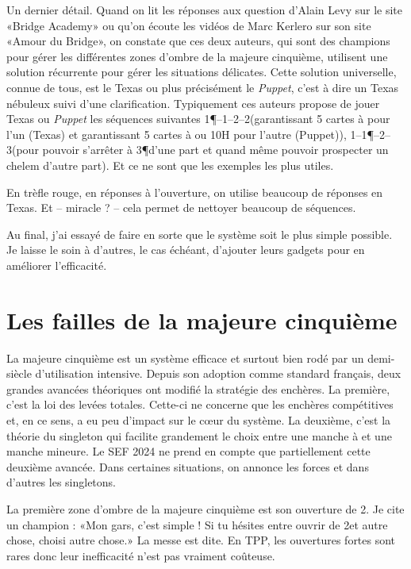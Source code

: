 Un dernier détail. Quand on lit les réponses aux question d'Alain Levy sur le site «Bridge Academy» ou qu'on écoute les vidéos de Marc Kerlero sur son site «Amour du Bridge», on constate que ces deux auteurs, qui sont des champions pour gérer les différentes zones d'ombre de la majeure cinquième, utilisent une solution récurrente pour gérer les situations délicates. Cette solution universelle, connue de tous, est le Texas ou plus précisément le \textit{Puppet}, c'est à dire un Texas nébuleux suivi d'une clarification. Typiquement ces auteurs propose de jouer Texas ou \textit{Puppet} les séquences suivantes 1\P--1\NT--2\T--2\K (garantissant 5 cartes à \C pour l'un (Texas) et garantissant 5 cartes à \C ou 10H pour l'autre (Puppet)), 1\T--1\P--2\NT--3\C (pour pouvoir s'arrêter à 3\P d'une part et quand même pouvoir prospecter un chelem d'autre part). Et ce ne sont que les exemples les plus utiles.

En trèfle rouge, en réponses à l'ouverture, on utilise beaucoup de réponses en Texas. Et -- miracle ? -- cela permet de nettoyer beaucoup de séquences.

Au final, j'ai essayé de faire en sorte que le système soit le plus simple possible. Je laisse le soin à d'autres, le cas échéant, d'ajouter leurs gadgets pour en améliorer l'efficacité.


\section{Les failles de la majeure cinquième}

La majeure cinquième est un système efficace et surtout bien rodé par un demi-siècle d'utilisation intensive. Depuis son adoption comme standard français, deux grandes avancées théoriques ont modifié la stratégie des enchères. La première, c'est la loi des levées totales. Cette-ci ne concerne que les enchères compétitives et, en ce sens, a eu peu d'impact sur le cœur du système. La deuxième, c'est la théorie du singleton qui facilite grandement le choix entre une manche à \NT et une manche mineure. Le SEF 2024 ne prend en compte que partiellement cette deuxième avancée. Dans certaines situations, on annonce les forces et dans d'autres les singletons.

La première zone d'ombre de la majeure cinquième est son ouverture de 2\T. Je cite un champion : «Mon gars, c'est simple ! Si tu hésites entre ouvrir de 2\T et autre chose, choisi autre chose.» La messe est dite. En TPP, les ouvertures fortes sont rares donc leur inefficacité n'est pas vraiment coûteuse.

